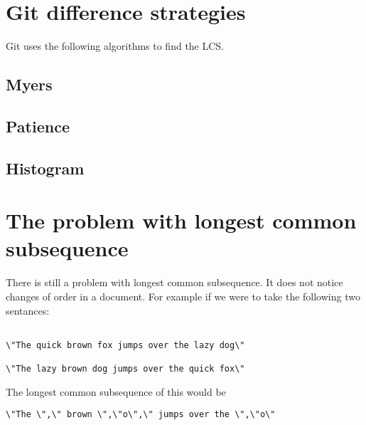 \section{Git difference strategies}
Git uses the following algorithms to find the LCS.

\subsection{Myers}


\subsection{Patience}


\subsection{Histogram}

\section{The problem with longest common subsequence}
There is still a problem with longest common subsequence. It does not notice changes of order in a document.  For example if we were to take the following two sentances:

\begin{verbatim}

\"The quick brown fox jumps over the lazy dog\"

\"The lazy brown dog jumps over the quick fox\"

\end{verbatim}

The longest common subsequence of this would be

\begin{verbatim}
\"The \",\" brown \",\"o\",\" jumps over the \",\"o\"
\end{verbatim}

